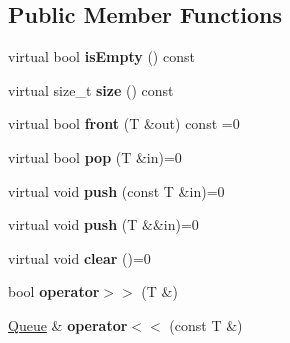 \subsection*{Public Member Functions}
\begin{DoxyCompactItemize}
\item 
\hypertarget{class_d_x_1_1_lock_free_1_1_queue_af66e7cba57d219d81608c24eb5e397d5}{virtual bool {\bfseries is\-Empty} () const }\label{class_d_x_1_1_lock_free_1_1_queue_af66e7cba57d219d81608c24eb5e397d5}

\item 
\hypertarget{class_d_x_1_1_lock_free_1_1_queue_ac28a6a1ff587e5005bd97d6c159533ed}{virtual size\-\_\-t {\bfseries size} () const }\label{class_d_x_1_1_lock_free_1_1_queue_ac28a6a1ff587e5005bd97d6c159533ed}

\item 
\hypertarget{class_d_x_1_1_lock_free_1_1_queue_a6e392d698cefc4b01ed27154a18524af}{virtual bool {\bfseries front} (T \&out) const =0}\label{class_d_x_1_1_lock_free_1_1_queue_a6e392d698cefc4b01ed27154a18524af}

\item 
\hypertarget{class_d_x_1_1_lock_free_1_1_queue_a10af88de439fbcd64e675907640533cd}{virtual bool {\bfseries pop} (T \&in)=0}\label{class_d_x_1_1_lock_free_1_1_queue_a10af88de439fbcd64e675907640533cd}

\item 
\hypertarget{class_d_x_1_1_lock_free_1_1_queue_aba6b10fa9f6d36fae16776ce7984009c}{virtual void {\bfseries push} (const T \&in)=0}\label{class_d_x_1_1_lock_free_1_1_queue_aba6b10fa9f6d36fae16776ce7984009c}

\item 
\hypertarget{class_d_x_1_1_lock_free_1_1_queue_adeb07374710138df3b5d28bddb8974ea}{virtual void {\bfseries push} (T \&\&in)=0}\label{class_d_x_1_1_lock_free_1_1_queue_adeb07374710138df3b5d28bddb8974ea}

\item 
\hypertarget{class_d_x_1_1_lock_free_1_1_queue_aedf62168879b92f0e269d2f1fba4c93a}{virtual void {\bfseries clear} ()=0}\label{class_d_x_1_1_lock_free_1_1_queue_aedf62168879b92f0e269d2f1fba4c93a}

\item 
\hypertarget{class_d_x_1_1_lock_free_1_1_queue_af83dc0f90f3534811f3057db384d58a8}{bool {\bfseries operator$>$$>$} (T \&)}\label{class_d_x_1_1_lock_free_1_1_queue_af83dc0f90f3534811f3057db384d58a8}

\item 
\hypertarget{class_d_x_1_1_lock_free_1_1_queue_ace553782c66d594008cc0e26f588f9cf}{\hyperlink{class_d_x_1_1_lock_free_1_1_queue}{Queue} \& {\bfseries operator$<$$<$} (const T \&)}\label{class_d_x_1_1_lock_free_1_1_queue_ace553782c66d594008cc0e26f588f9cf}

\end{DoxyCompactItemize}
